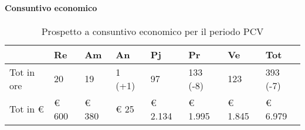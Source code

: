 \paragraph{Consuntivo economico}
\begin{table}[H] \begin{center} \begin{tabular}{llllllll}																						
			\toprule	
			&	Re		&	Am		&	An		&	Pj		&	Pr		&	Ve		&	Tot	 \\ 	
			\midrule																		
			Tot in ore	&	20		&	19		&	1	(+1)&	97		&	133	(-8)&	123	&	393	(-7)\\
			Tot in €	&	 € 600 		 & 	 € 380 		 & 	 € 25 		 & 	 € 2.134 		 & 	 € 1.995 		 & 	 € 1.845 		 & 	 € 6.979 	\\
			\bottomrule																						
		\end{tabular} \end{center} \caption{Prospetto a consuntivo economico per il periodo PCV																					
	}\label{tab:s_PCV_c} \end{table}


				
